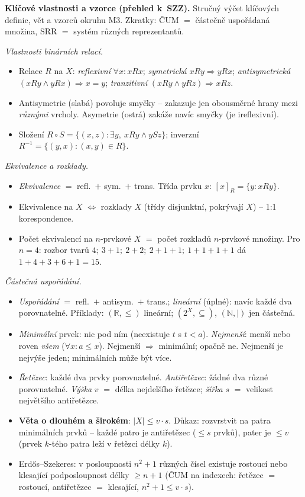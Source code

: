 \documentclass[11pt,a4paper]{article}
\begin{document}
\begin{poznamka}
\textbf{Klíčové vlastnosti a vzorce (přehled k~SZZ).} Stručný výčet klíčových definic, vět a vzorců okruhu M3. Zkratky: ČUM $=$ částečně uspořádaná množina, SRR $=$ systém různých reprezentantů.

\smallskip
\emph{Vlastnosti binárních relací.}
\begin{itemize}
  \item Relace $R$ na $X$: \emph{reflexivní} $\forall x\colon xRx$; \emph{symetrická} $xRy\Rightarrow yRx$; \emph{antisymetrická} $(xRy\wedge yRx)\Rightarrow x=y$; \emph{tranzitivní} $(xRy\wedge yRz)\Rightarrow xRz$.
  \item Antisymetrie (slabá) povoluje smyčky -- zakazuje jen obousměrné hrany mezi \emph{různými} vrcholy. Asymetrie (ostrá) zakáže navíc smyčky (je ireflexivní).
  \item Složení $R\circ S=\{(x,z):\exists y,\ xRy\wedge ySz\}$; inverzní $R^{-1}=\{(y,x):(x,y)\in R\}$.
\end{itemize}

\smallskip
\emph{Ekvivalence a rozklady.}
\begin{itemize}
  \item \emph{Ekvivalence} $=$ refl.\ $+$ sym.\ $+$ trans. Třída prvku $x$: $[x]_R=\{y:xRy\}$.
  \item Ekvivalence na $X$ $\iff$ rozklady $X$ (třídy disjunktní, pokrývají $X$) -- 1:1 korespondence.
  \item Počet ekvivalencí na $n$-prvkové $X$ $=$ počet rozkladů $n$-prvkové množiny. Pro $n{=}4$: rozbor tvarů $4;\ 3{+}1;\ 2{+}2;\ 2{+}1{+}1;\ 1{+}1{+}1{+}1$ dá $1+4+3+6+1=15$.
\end{itemize}

\smallskip
\emph{Částečná uspořádání.}
\begin{itemize}
  \item \emph{Uspořádání} $=$ refl.\ $+$ antisym.\ $+$ trans.; \emph{lineární} (úplné): navíc každé dva porovnatelné. Příklady: $(\mathbb{R},\le)$ lineární; $(2^X,\subseteq)$, $(\mathbb{N},\mid)$ jen částečná.
  \item \emph{Minimální} prvek: nic pod ním (neexistuje $t$ s $t<a$). \emph{Nejmenší}: menší nebo roven \emph{všem} ($\forall x: a\le x$). Nejmenší $\Rightarrow$ minimální; opačně ne. Nejmenší je nejvýše jeden; minimálních může být více.
  \item \emph{Řetězec}: každé dva prvky porovnatelné. \emph{Antiřetězec}: žádné dva různé porovnatelné. \emph{Výška} $v$ $=$ délka nejdelšího řetězce; \emph{šířka} $s$ $=$ velikost největšího antiřetězce.
  \item \textbf{Věta o dlouhém a širokém}: $|X|\le v\cdot s$. Důkaz: rozvrstvit na patra minimálních prvků -- každé patro je antiřetězec ($\le s$ prvků), pater je $\le v$ (prvek $k$-tého patra leží v řetězci délky $k$).
  \item Erdős--Szekeres: v posloupnosti $n^2{+}1$ různých čísel existuje rostoucí nebo klesající podposloupnost délky $\ge n{+}1$ (ČUM na indexech: řetězec $=$ rostoucí, antiřetězec $=$ klesající, $n^2{+}1\le v\cdot s$).
\end{itemize}


\end{poznamka}
\end{document}

